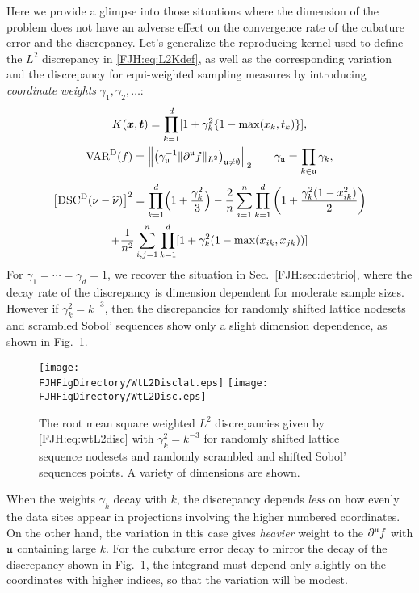 \documentclass[graybox,footinfo]{svmult}
\begin{document}
Here we provide a glimpse into those situations where the dimension of the problem does 
not have an adverse effect on the convergence rate of the cubature error and the 
discrepancy.  Let's generalize the reproducing kernel used to define the 
$L^2$ discrepancy in \eqref{FJH:eq:L2Kdef}, as well as the corresponding 
variation and the discrepancy for equi-weighted sampling measures by introducing 
\emph{coordinate weights} $\gamma_1, \gamma_2, \ldots$:
\begin{gather*} \label{FJH:eq:wtL2Kdef}
K(\bsx,\bst) =\prod_{k = 1}^d [1 + \gamma_k^2\{1 - \max(x_k,t_k)\}], \\
\Var^\Dt(f) = \Bigl \lVert \bigl (\gamma_{\fraku}^{-1}
\lVert\partial^{\fraku} f\rVert_{L^2}\bigr )_{\fraku \ne \emptyset} \Bigr \rVert_2 \qquad
\gamma_{\fraku} = \prod_{k \in \fraku} \gamma_k,
\end{gather*}
\begin{multline} \label{FJH:eq:wtL2disc}
\bigl[\disc^\Dt(\nu - \hnu)\bigr]^2 = \prod_{k=1}^d\Bigl(1 + \frac{\gamma_k^2}{3}\Bigr)
- \frac{2}{n} \sum_{i=1}^n \prod_{k=1}^d \left (1 + \frac{\gamma_k^2(1 - 
x_{ik}^2)}{2} \right) \\ + \frac{1}{n^2}\sum_{i,j=1}^n \prod_{k = 1}^d [1 + 
\gamma_k^2( 1 - \max(x_{ik},x_{jk}))]
\end{multline}
For $\gamma_1 = \cdots = \gamma_d = 1$, we recover the situation in Sec.\ 
\ref{FJH:sec:dettrio}, where the decay rate of the discrepancy is dimension dependent 
for moderate sample sizes.  However if $\gamma_k^2 = 
k^{-3}$, then the discrepancies for randomly shifted lattice nodesets and scrambled   
Sobol' sequences show only a slight dimension dependence, as shown in Fig.\ 
\ref{FJH:fig:wtdiscdiffpts}.

\begin{figure}
	\centering
	\texttt{[image: \\FJHFigDirectory/WtL2Disclat.eps]}   \qquad 
	\texttt{[image: \\FJHFigDirectory/WtL2Disc.eps]} 
	\caption{The root mean square weighted $L^2$ discrepancies given by 
	\eqref{FJH:eq:wtL2disc} with $\gamma_k^2 = 
	k^{-3}$
		for randomly shifted 
		lattice sequence nodesets and randomly scrambled and shifted Sobol' sequences 
		points.  A variety of dimensions are shown.
		\label{FJH:fig:wtdiscdiffpts}}
\end{figure}

When the weights $\gamma_k$ decay with $k$, the discrepancy depends \emph{less} 
on how evenly the data sites appear in projections involving the higher numbered 
coordinates.  On 
the other hand, the variation in this case gives 
\emph{heavier} weight to the $\partial^{{\mathfrak{u}}} f$ with 
${\mathfrak{u}}$ containing large $k$.  For the cubature error decay to mirror the decay of the 
discrepancy shown in Fig.\ \ref{FJH:fig:wtdiscdiffpts}, the integrand must depend only 
slightly on the coordinates with higher indices, so that the variation will be modest.
\end{document}
